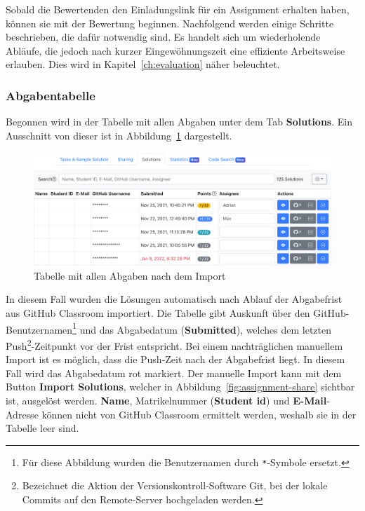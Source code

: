 Sobald die Bewertenden den Einladungslink für ein Assignment erhalten haben, können sie mit der Bewertung beginnen.
Nachfolgend werden einige Schritte beschrieben, die dafür notwendig sind.
Es handelt sich um wiederholende Abläufe, die jedoch nach kurzer Eingewöhnungszeit eine effiziente Arbeitsweise erlauben.
Dies wird in Kapitel~\ref{ch:evaluation} näher beleuchtet.

\subsubsection{Abgabentabelle}

Begonnen wird in der Tabelle mit allen Abgaben unter dem Tab \textbf{Solutions}.
Ein Ausschnitt von dieser ist in Abbildung~\ref{fig:assignment-solutions-table} dargestellt.

\begin{figure}
    \centering
    \includegraphics[width=\textwidth]{images/assignment-solutions-table}
    \caption{Tabelle mit allen Abgaben nach dem Import}
    \label{fig:assignment-solutions-table}
\end{figure}

In diesem Fall wurden die Lösungen automatisch nach Ablauf der Abgabefrist aus GitHub Classroom importiert.
Die Tabelle gibt Auskunft über den GitHub-Benutzernamen\footnote{
    Für diese Abbildung wurden die Benutzernamen durch \texttt{*}-Symbole ersetzt.
} und das Abgabedatum (\textbf{Submitted}), welches dem letzten Push\footnote{
    Bezeichnet die Aktion der Versionskontroll-Software Git, bei der lokale Commits auf den Remote-Server hochgeladen werden.
}-Zeitpunkt vor der Frist entspricht.
Bei einem nachträglichen manuellem Import ist es möglich, dass die Push-Zeit nach der Abgabefrist liegt.
In diesem Fall wird das Abgabedatum rot markiert.
Der manuelle Import kann mit dem Button \textbf{Import Solutions}, welcher in Abbildung~\ref{fig:assignment-share} sichtbar ist, ausgelöst werden.
\textbf{Name}, Matrikelnummer (\textbf{Student \acs{id}}) und \textbf{E-Mail}-Adresse können nicht von GitHub Classroom ermittelt werden, weshalb sie in der Tabelle leer sind.

